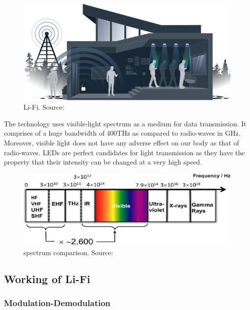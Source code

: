\documentclass{article}
\begin{document}
\begin{figure}[!h]
  \includegraphics[width=\linewidth]{res/tech-illustration-li-fi.png}
    \caption{Li-Fi. Source: \parencite{purelifi}}
  \label{fig:tech-illustration-li-fi}
\end{figure}


The technology uses visible-light spectrum as a medium for data transmission.
It comprises of a huge bandwidth of 400THz as compared to radio-waves in GHz.
Moreover, visible light does not have any adverse effect on our body as that of
radio-waves. LEDs are perfect candidates for light transmission as they have
the property that their intensity can be changed at a very high speed.


\begin{figure}[!h]
  \includegraphics[width=\linewidth]{res/spectrum_li_fi.jpg}
    \caption{spectrum comparison. Source: \parencite{hass18}}
  \label{fig:spectrum_li_fi}
\end{figure}




\subsection{Working of Li-Fi}


\subsubsection{Modulation-Demodulation}
\end{document}
